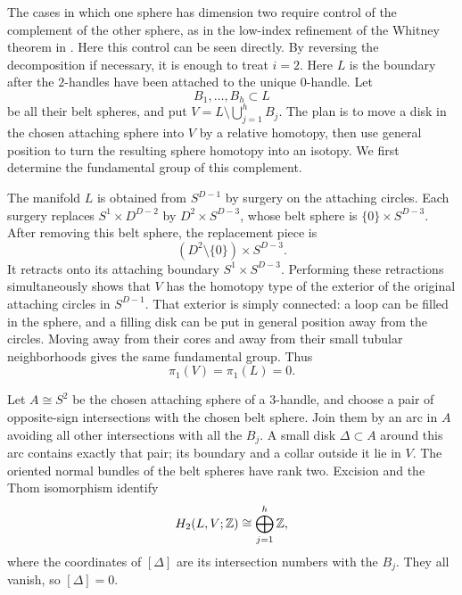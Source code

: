 The cases in which one sphere has dimension two require control of the
complement of the other sphere, as in the low-index refinement of the
Whitney theorem in \cite[Theorem~6.6]{Milnor1965}.  Here this control
can be seen directly.  By reversing the decomposition if necessary, it is enough to
treat $i=2$.  Here $L$ is the boundary after the $2$-handles have been
attached to the unique $0$-handle.  Let
\[
 B_1,\ldots,B_h\subset L
\]
be all their belt spheres, and put
$V=L\setminus\bigcup_{j=1}^h B_j$.
The plan is to move a disk in the chosen attaching sphere into $V$ by a
relative homotopy, then use general position to turn the resulting sphere
homotopy into an isotopy. We first determine the fundamental group of this
complement.

The manifold $L$ is obtained from $S^{D-1}$ by surgery on the attaching
circles.  Each surgery replaces
$S^1\times D^{D-2}$ by $D^2\times S^{D-3}$, whose belt sphere is
$\{0\}\times S^{D-3}$.  After removing this belt sphere, the replacement
piece is
\[
 (D^2\setminus\{0\})\times S^{D-3}.
\]
It retracts onto its attaching boundary
$S^1\times S^{D-3}$.  Performing these retractions simultaneously shows
that $V$ has the homotopy type of the exterior of the original attaching
circles in $S^{D-1}$.  That exterior is simply connected: a loop can be
filled in the sphere, and a filling disk can be put in general position
away from the circles.  Moving away from their cores and away from their
small tubular neighborhoods gives the same fundamental group.  Thus
\begin{equation}\label{eq:belt-complement-pi1}
 \pi_1(V)=\pi_1(L)=0.
\end{equation}

Let $A\cong S^2$ be the chosen attaching sphere of a $3$-handle, and
choose a pair of opposite-sign intersections with the chosen belt
sphere.  Join them by an arc in $A$ avoiding all other intersections
with all the $B_j$.  A small disk $\Delta\subset A$ around this arc
contains exactly that pair; its boundary and a collar outside it lie in
$V$.  The oriented normal bundles of the belt spheres have rank two.
Excision and the Thom isomorphism identify
\begin{equation}\label{eq:relative-intersection-group}
 H_2(L,V;\mathbb Z)\cong\bigoplus_{j=1}^h\mathbb Z,
\end{equation}
where the coordinates of $[\Delta]$ are its intersection numbers with
the $B_j$.  They all vanish, so $[\Delta]=0$.

